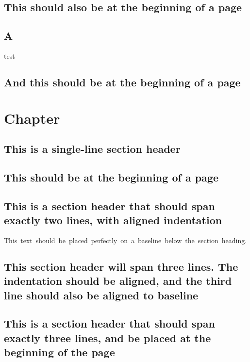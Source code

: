\documentclass[baselinegrid,noprint,nocopyright]{uit-thesis}
\begin{document}
\section{This should also be at the beginning of a page}
\section{A}
test

\newpage
\section{And this should be at the beginning of a page}


\chapter{Chapter}
\lipsum[1]

\section{This is a single-line section header}
\lipsum[3-7]

\section{This should be at the beginning of a page}
\lipsum[8]

\section{This is a section header that should span exactly two lines, with aligned indentation}
\mbox{This~text~should~be~placed~perfectly~on~a~baseline~below~the~section~heading.}

\lipsum[9]

\section{This section header will span three lines. The indentation should be aligned, and the third line should also be aligned to baseline}
\lipsum[10-14]

\section{This is a section header that should span exactly three lines, and be placed at the beginning of the page}

\lipsum[15-17]
\end{document}
